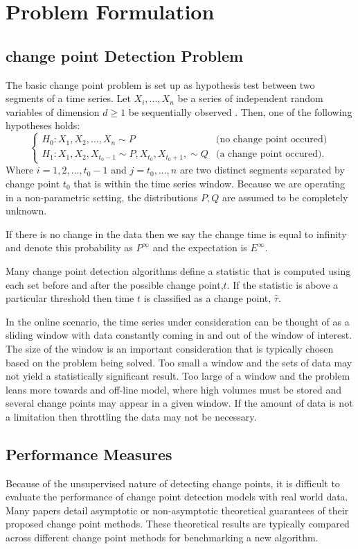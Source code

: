 \section{Problem Formulation}

\subsection{change point Detection Problem}
The basic change point problem is set up as hypothesis test between two segments of a time series. Let $X_i,...,X_n$ be a series of independent random variables of dimension $d \geq 1$ be sequentially observed . Then, one of the following hypotheses holds:
\begin{equation}
  \begin{cases}
    H_0: X_1, X_2, ...,X_n \sim  P & \text{(no change point occured)} \\
    H_1: X_1,X_2, X_{t_0-1} \sim P, X_{t_0}, X_{t_0+1},  \sim Q & \text{(a change point occured)}. 
  \end{cases}
\end{equation}
Where $i=1,2,...,t_0-1$ and $j=t_0,...,n$  are two distinct segments separated by change point $t_0$ that is within the time series window.  Because we are operating in a non-parametric setting, the distributions $P, Q$ are assumed to be completely unknown. 

If there is no change in the data then we say the change time is equal to infinity and denote this probability as $P^{\infty}$ and the expectation is $E^{\infty}$.

Many change point detection algorithms define a statistic that is computed using each set before and after the possible change point,$t$. If the statistic is above a particular threshold then time $t$ is classified as a change point, $\hat{\tau}$.

In the online scenario, the time series under consideration can be thought of as a sliding window with data constantly coming in and out of the window of interest. The size of the window is an important consideration that is typically chosen based on the problem being solved. Too small a window and the sets of data may not yield a statistically significant result. Too large of a window and the problem leans more towards and off-line model, where high volumes must be stored and several change points may appear in a given window. If the amount of data is not a limitation then throttling the data may not be necessary.

\subsection{Performance Measures}
Because of the unsupervised nature of detecting change points, it is difficult to evaluate the performance of change point detection models with real world data. Many papers detail asymptotic or non-asymptotic theoretical guarantees of their proposed change point methods.  These theoretical results are typically compared across different change point methods for benchmarking a new algorithm.

